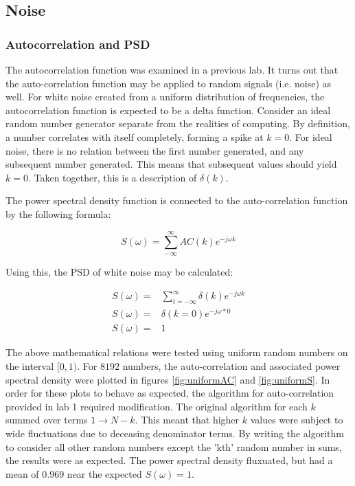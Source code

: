 \documentclass[twocolumn]{article}
\begin{document}
\subsection{Noise}
\subsubsection{Autocorrelation and PSD}
The autocorrelation function was examined in a previous lab. It turns out that the auto-correlation function may be applied to random signals (i.e. noise) as well. For white noise created from a uniform distribution of frequencies, the autocorrelation function is expected to be a delta function. Consider an ideal random number generator separate from the realities of computing. By definition, a number correlates with itself completely, forming a spike at $k=0$. For ideal noise, there is no relation between the first number generated, and any subsequent number generated. This means that subsequent values should yield $k=0$. Taken together, this is a description of $\delta(k)$.

The power spectral density function is connected to the auto-correlation function by the following formula:

\[ S(\omega) = \sum_{-\infty}^{\infty} AC(k)e^{-j\omega k} \]

Using this, the PSD of white noise may be calculated:

\begin{equation}
\begin{split}
S(\omega) =&  \sum_{i=-\infty}^{\infty} \delta (k) e^{-j\omega k}\\
S(\omega) =& \delta(k=0) e^{-j\omega * 0} \\
S(\omega) =& 1
\end{split}
\end{equation}

The above mathematical relations were tested using uniform random numbers on the interval $[0,1)$. For $8192$ numbers, the auto-correlation and associated power spectral density were plotted in figures \ref{fig:uniformAC} and \ref{fig:uniformS}. In order for these plots to behave as expected, the algorithm for auto-correlation provided in lab 1 required modification. The original algorithm for each $k$ summed over terms $1\to N-k$. This meant that higher $k$ values were subject to wide fluctuations due to deceasing denominator terms. By writing the algorithm to consider all other random numbers except the 'kth' random number in sums, the results were as expected. The power spectral density fluxuated, but had a mean of $0.969$ near the expected $S(\omega)=1$.
\end{document}
